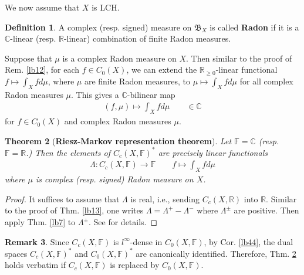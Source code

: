 \documentclass[12pt,b5paper,notitlepage]{article}
\theoremstyle{definition}
\newtheorem{df}{Definition}[section]
\newtheorem{rem}[df]{Remark}
\theoremstyle{plain}
\newtheorem{thm}[df]{Theorem}
\newcommand{\fk}{\mathfrak}
\newcommand{\ovl}{\overline}
\newcommand{\Cbb}{\mathbb C}
\newcommand{\Rbb}{\mathbb R}
\newcommand{\Fbb}{\mathbb F}
\numberwithin{equation}{section}
\begin{document}
We now assume that $X$ is LCH. 

\begin{df}
A complex (resp. signed) measure on $\fk B_X$ is called \textbf{Radon} if it is a $\Cbb$-linear (resp. $\Rbb$-linear) combination of finite Radon measures. 
\end{df}

Suppose that $\mu$ is a complex Radon measure on $X$. Then similar to the proof of Rem. \ref{lb12}, for each $f\in C_0(X)$, we can extend the $\Rbb_{\geq0}$-linear functional $f\mapsto\int_X fd\mu$, where $\mu$ are finite Radon measures, to $\mu\mapsto \int_X fd\mu$ for all complex Radon measures $\mu$. This gives a $\Cbb$-bilinear map
\begin{align*}
(f,\mu)\mapsto\int_X fd\mu\qquad\in\Cbb
\end{align*}
for $f\in C_0(X)$ and complex Radon measures $\mu$.



\begin{thm}[\textbf{Riesz-Markov representation theorem}] \label{lb8}
Let $\Fbb=\Cbb$ (resp. $\Fbb=\Rbb$.) Then the elements of $C_c(X,\Fbb)^*$ are precisely linear functionals
\begin{align*}
\Lambda:C_c(X,\Fbb)\rightarrow\Fbb \qquad f\mapsto \int_X fd\mu
\end{align*}
where $\mu$ is complex (resp. signed) Radon measure on $X$.
\end{thm}




\begin{proof}
It suffices to assume that $\Lambda$ is real, i.e., sending $C_c(X,\Rbb)$ into $\Rbb$. Similar to the proof of Thm. \ref{lb13}, one writes $\Lambda=\Lambda^+-\Lambda^-$ where $\Lambda^\pm$ are positive. Then apply Thm. \ref{lb7} to $\Lambda^\pm$. See \cite[Subsec. 25.10.2]{Gui-A} for details.
\end{proof}




\begin{rem}
Since $C_c(X,\Fbb)$ is $l^\infty$-dense in $C_0(X,\Fbb)$, by Cor. \ref{lb44}, the dual spaces $C_c(X,\Fbb)^*$ and $C_0(X,\Fbb)^*$ are canonically identified. Therefore, Thm. \ref{lb8} holds verbatim if $C_c(X,\Fbb)$ is replaced by $C_0(X,\Fbb)$.  
\end{rem}


\begin{comment}
\begin{df}
Let $\mu$ be a complex Radon measure on $X$. Let $\Lambda\in C_c(X,\Fbb)^*=C_0(X,\Fbb)^*$ be the linear functional corresponding to $\mu$ as in Thm. \ref{lb8}. The \textbf{total variation} \pmb{$\Vert\mu\Vert$} \index{00@Total variation $\Vert\mu\Vert$} \index{zz@$\Vert\mu\Vert$, the total variation} is defined to be the operator norm of $\Lambda$, i.e.,
\begin{align*}
\Vert\mu\Vert=\Vert\Lambda\Vert=\sup_{f\in \ovl B_{C_c(X)}(0,1)}|\Lambda(f)|=\sup_{f\in \ovl B_{C_0(X)}(0,1)}|\Lambda(f)|
\end{align*}
\end{df}
\end{comment}
\end{document}
